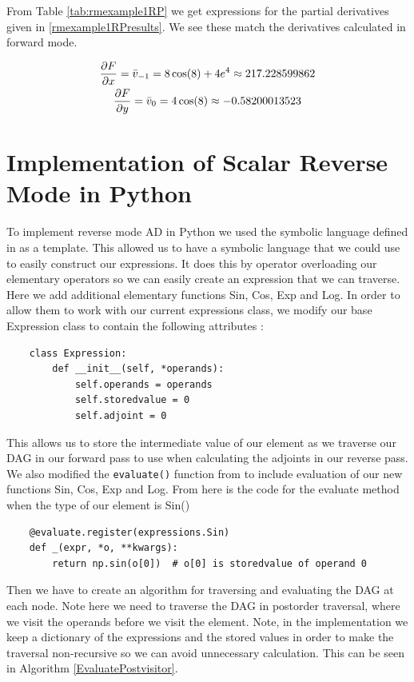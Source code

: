 \documentclass{article}
\begin{document}
From Table \ref{tab:rmexample1RP} we get expressions for the partial derivatives given in \eqref{rmexample1RPresults}. We see these  match the  derivatives calculated in forward mode.

\begin{equation} \label{rmexample1RPresults}
    \begin{gathered}
    \frac{\partial F}{\partial x} = \Bar{v}_{-1} = 8\cos(8) + 4e^4 \approx 217.228599862 \\
    \frac{\partial F}{\partial y} = \Bar{v}_0 =  4\cos(8) \approx -0.58200013523
    \end{gathered}
\end{equation}

\section{Implementation of Scalar Reverse Mode in Python}

To implement reverse mode AD in Python we used the symbolic language defined in \cite{PoPBook} as a template. This allowed us to have a symbolic language that we could use to easily construct our expressions. It does this by operator overloading our elementary operators so we can easily create an expression that we can traverse. Here we add additional elementary functions Sin, Cos, Exp and Log. In order to allow them to work with our current expressions class, we modify our base Expression class to contain the following attributes \cite{github}:
\begin{verbatim}
    class Expression:
        def __init__(self, *operands):
            self.operands = operands
            self.storedvalue = 0
            self.adjoint = 0
\end{verbatim}
This allows us to store the intermediate value of our element as we traverse our DAG in our forward pass to use when calculating the adjoints in our reverse pass. We also modified the \verb|evaluate()| function from \cite{PoPBook} to include evaluation of our new functions Sin, Cos, Exp and Log. From \cite{github} here is the code for the evaluate method when the type of our element is Sin()
\begin{verbatim}
    @evaluate.register(expressions.Sin)
    def _(expr, *o, **kwargs):
        return np.sin(o[0])  # o[0] is storedvalue of operand 0
\end{verbatim}

Then we have to create an algorithm for traversing and evaluating the DAG at each node. Note here we need to traverse the DAG in postorder traversal, where we visit the operands before we visit the element. Note, in the implementation we keep a dictionary of the expressions and the stored values in order to make the traversal non-recursive so we can avoid unnecessary calculation. This can be seen in Algorithm \ref{EvaluatePostvisitor}.
\end{document}
